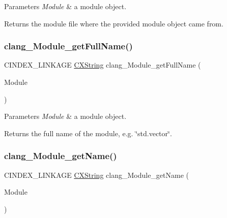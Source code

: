 \begin{DoxyParams}{Parameters}
{\em Module} & a module object.\\
\hline
\end{DoxyParams}
\begin{DoxyReturn}{Returns}
the module file where the provided module object came from. 
\end{DoxyReturn}
\mbox{\label{group__CINDEX__MODULE_ga09d2da739b4bbac05fa2c1ad6695095a}} 
\subsubsection{\texorpdfstring{clang\+\_\+\+Module\+\_\+get\+Full\+Name()}{clang\_Module\_getFullName()}}
{\footnotesize\ttfamily C\+I\+N\+D\+E\+X\+\_\+\+L\+I\+N\+K\+A\+GE \mbox{\hyperlink{structCXString}{C\+X\+String}} clang\+\_\+\+Module\+\_\+get\+Full\+Name (\begin{DoxyParamCaption}\item[{C\+X\+Module}]{Module }\end{DoxyParamCaption})}


\begin{DoxyParams}{Parameters}
{\em Module} & a module object.\\
\hline
\end{DoxyParams}
\begin{DoxyReturn}{Returns}
the full name of the module, e.\+g. \char`\"{}std.\+vector\char`\"{}. 
\end{DoxyReturn}
\mbox{\label{group__CINDEX__MODULE_ga39896de675e90c4fb2de55e109d376a8}} 
\subsubsection{\texorpdfstring{clang\+\_\+\+Module\+\_\+get\+Name()}{clang\_Module\_getName()}}
{\footnotesize\ttfamily C\+I\+N\+D\+E\+X\+\_\+\+L\+I\+N\+K\+A\+GE \mbox{\hyperlink{structCXString}{C\+X\+String}} clang\+\_\+\+Module\+\_\+get\+Name (\begin{DoxyParamCaption}\item[{C\+X\+Module}]{Module }\end{DoxyParamCaption})}


